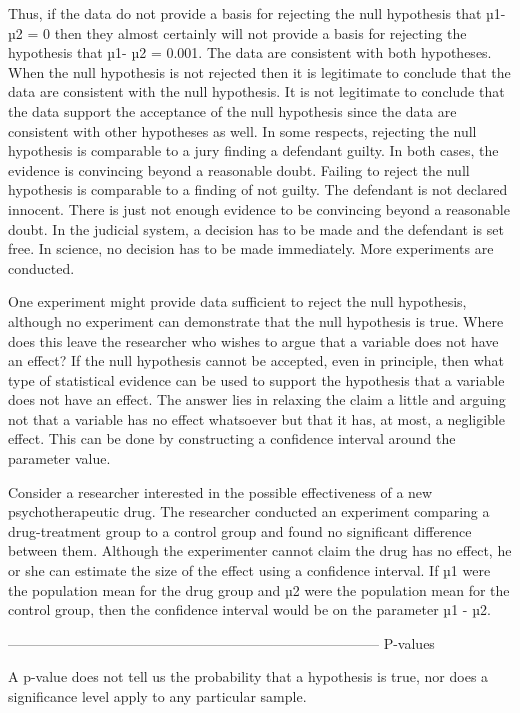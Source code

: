Thus, if the data do not provide a basis for rejecting the null hypothesis that µ1- µ2 = 0 then they almost certainly will not provide a basis for rejecting the hypothesis that µ1- µ2 = 0.001. The data are consistent with both hypotheses. When the null hypothesis is not rejected then it is legitimate to conclude that the data are consistent with the null hypothesis. It is not legitimate to conclude that the data support the acceptance of the null hypothesis since the data are consistent with other hypotheses as well. In some respects, rejecting the null hypothesis is comparable to a jury finding a defendant guilty. In both cases, the evidence is convincing beyond a reasonable doubt. Failing to reject the null hypothesis is comparable to a finding of not guilty. The defendant is not declared innocent. There is just not enough evidence to be convincing beyond a reasonable doubt. In the judicial system, a decision has to be made and the defendant is set free. In science, no decision has to be made immediately. More experiments are conducted.


One experiment might provide data sufficient to reject the null hypothesis, although no experiment can demonstrate that the null hypothesis is true. Where does this leave the researcher who wishes to argue that a variable does not have an effect? If the null hypothesis cannot be accepted, even in principle, then what type of statistical evidence can be used to support the hypothesis that a variable does not have an effect. The answer lies in relaxing the claim a little and arguing not that a variable has no effect whatsoever but that it has, at most, a negligible effect. This can be done by constructing a confidence interval around the parameter value.


Consider a researcher interested in the possible effectiveness of a new psychotherapeutic drug. The researcher conducted an experiment comparing a drug-treatment group to a control group and found no significant difference between them. Although the experimenter cannot claim the drug has no effect, he or she can estimate the size of the effect using a confidence interval. If µ1 were the population mean for the drug group and µ2 were the population mean for the control group, then the confidence interval would be on the parameter µ1 - µ2. 




--------------------------------------------------------------------------------
P-values

A p-value does not tell us the probability that a hypothesis is true, nor does a significance level apply to any particular sample.

